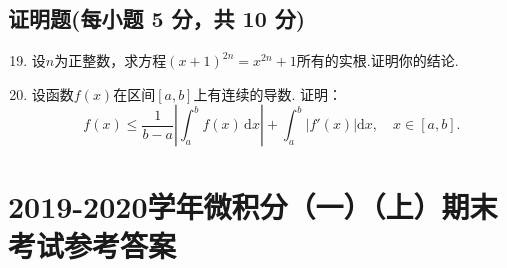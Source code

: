 \documentclass[../Main.tex]{subfiles}
\begin{document}
\section{证明题(每小题 5 分，共 10 分)}
\begin{enumerate}
    \setcounter{enumi}{18}
    \item 设$n$为正整数，求方程$(x+1)^{2n}=x^{2n}+1$所有的实根.证明你的结论.
          \vspace{15em}

    \item 设函数$f(x)$在区间$[a,b]$上有连续的导数. 证明：
          \[
              f(x)\leq \frac{1}{b-a}\left|\int_{a}^{b}f(x)\,\mathrm{d}x\right|+\int_{a}^{b}
              \left|f'(x)\right|\mathrm{d}x,\quad x\in[a,b].
          \]
          \vspace{15em}
\end{enumerate}

\chapter{2019-2020学年微积分（一）（上）期末考试参考答案}
\end{document}
